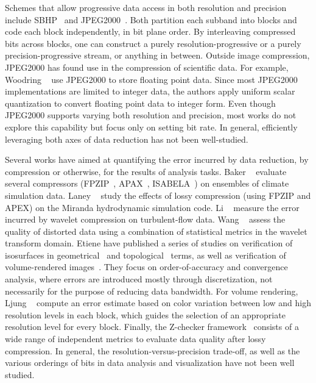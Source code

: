 Schemes that allow progressive data access in both resolution and precision include
SBHP~\cite{sbhp2000} and JPEG2000~\cite{jpeg2000}. Both partition each subband into blocks and code
each block independently, in bit plane order. By interleaving compressed bits across blocks, one can
construct a purely resolution-progressive or a purely precision-progressive stream, or anything in
between. Outside image compression, JPEG2000 has found use in the compression of scientific data.
For example, Woodring \etal~\cite{woodring2011} use JPEG2000 to store floating point data. Since
most JPEG2000 implementations are limited to integer data, the authors apply uniform scalar
quantization to convert floating point data to integer form. Even though JPEG2000 supports varying
both resolution and precision, most works do not explore this capability but focus only on setting
bit rate. In general, efficiently leveraging both axes of data reduction has not been well-studied.

Several works have aimed at quantifying the error incurred by data reduction, by compression or
otherwise, for the results of analysis tasks. Baker \etal~\cite{evaluating-compression-climate}
evaluate several compressors (FPZIP~\cite{fpzip}, APAX~\cite{apax}, ISABELA~\cite{isabela}) on
ensembles of climate simulation data. Laney \etal~\cite{compression_sim2013} study the effects of
lossy compression (using FPZIP and APEX) on the Miranda hydrodynamic simulation code. Li
\etal~\cite{evaluating-efficacy-wavelet} measure the error incurred by wavelet compression on
turbulent-flow data. Wang \etal~\cite{statistical-volume-quality} assess the quality of distorted
data using a combination of statistical metrics in the wavelet transform domain. Etiene \etal have
published a series of studies on verification of isosurfaces in
geometrical~\cite{verifiable-isosurface} and topological~\cite{topology-verification-isosurface}
terms, as well as verification of volume-rendered images~\cite{verifying-volume-rendering}. They
focus on order-of-accuracy and convergence analysis, where errors are introduced mostly through
discretization, not necessarily for the purpose of reducing data bandwidth. For
volume rendering, Ljung \etal~\cite{transfer-function-based} compute an error estimate based on
color variation between low and high resolution levels in each block, which guides the selection of
an appropriate resolution level for every block. Finally, the Z-checker framework~\cite{z-checker}
consists of a wide range of independent metrics to evaluate data quality after lossy compression. In
general, the resolution-versus-precision trade-off, as well as the various orderings of bits in data
analysis and visualization have not been well studied.

